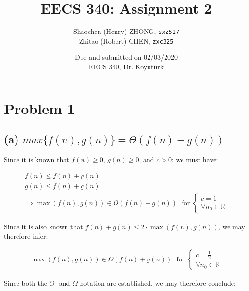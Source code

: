 \documentclass[12pt]{article}
\newcommand{\inlinecode}{\texttt}
\begin{document}
\title{\textbf{EECS 340: Assignment 2}}

\author{Shaochen (Henry) ZHONG, \inlinecode{sxz517} \\ Zhitao (Robert) CHEN, \inlinecode{zxc325}}
\date{Due and submitted on 02/03/2020 \\ EECS 340, Dr. Koyutürk}
\maketitle

\section{Problem 1}

\subsection{(a) $max\{f(n), g(n)\} = \Theta (f(n) + g(n))$}

Since it is known that $f(n) \geq 0$, $g(n) \geq 0$, and $c > 0$; we must have:

\begin{gather}
    f(n) \leq f(n) + g(n) \nonumber\\
    g(n) \leq f(n) + g(n) \nonumber\\
    \Rightarrow \max(f(n), g(n)) \in O(f(n) + g(n)) \ \ \ \text{for } \begin{cases}
                    c = 1 \\
                    \forall{n_{0}} \in \mathbb{R}
                \end{cases}
\end{gather}

Since it is also known that $f(n) + g(n) \leq 2 \cdot \max(f(n),g(n))$, we may therefore infer:

\begin{gather}
    \max(f(n), g(n)) \in \Omega(f(n) + g(n)) \ \ \ \text{for } \begin{cases}
        c = \frac{1}{2} \\
        \forall{n_{0}} \in \mathbb{R}
    \end{cases}
\end{gather}

Since both the $O$- and $\Omega$-notation are established, we may therefore conclude:
\end{document}
